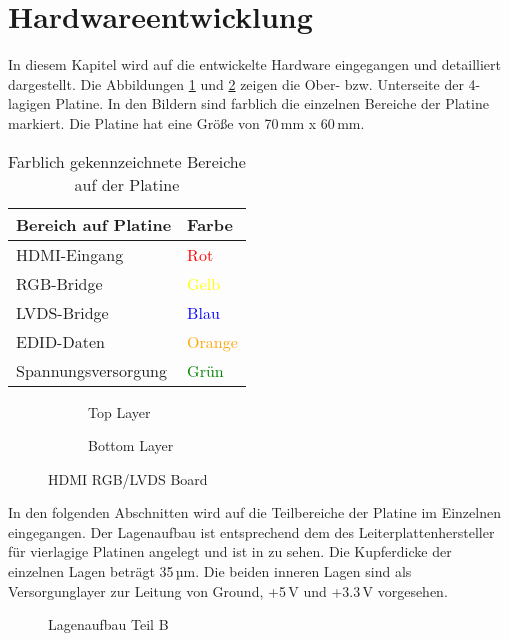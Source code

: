\section{Hardwareentwicklung}
\label{sec:TeilB_Hardware}
In diesem Kapitel wird auf die entwickelte Hardware eingegangen und detailliert dargestellt. Die Abbildungen \ref{fig:teilb_pcb_top} und \ref{fig:teilb_pcb_bot} zeigen die Ober- bzw. Unterseite der 4-lagigen Platine. In den Bildern sind farblich die einzelnen Bereiche der Platine markiert. Die Platine hat eine Größe von 70\,mm x 60\,mm.

\begin{table}[h]
\begin{tabular}{|p{8cm}|p{5.5cm}|}\hline
\rowcolor{TableBackgroundColor} 
   \textbf{Bereich auf Platine} & \textbf{Farbe}\\ \hline
  HDMI-Eingang &  \textcolor{red}{Rot} \\ \hline
  RGB-Bridge & \textcolor{yellow}{Gelb} \\ \hline
  LVDS-Bridge & \textcolor{blue}{Blau}  \\ \hline
  EDID-Daten &  \textcolor{orange}{Orange} \\ \hline
  Spannungsversorgung &  \textcolor{green}{Grün} \\ \hline 
\end{tabular}
\caption{Farblich gekennzeichnete Bereiche auf der Platine}
\label{tab:pcb_areas}
\end{table}

\begin{figure}[htbp]
        \centering
        \begin{subfigure}[htp]{0.48\textwidth}
                \caption{Top Layer}
                \label{fig:teilb_pcb_top}
        \end{subfigure}
\quad 
        \begin{subfigure}[htp]{0.48\textwidth}
                             				\caption{Bottom Layer}
                \label{fig:teilb_pcb_bot}
        \end{subfigure}
        \caption{HDMI RGB/LVDS Board}
        \label{fig:teilb_pcb}
\end{figure}

In den folgenden Abschnitten wird auf die Teilbereiche der Platine im Einzelnen eingegangen. Der Lagenaufbau ist entsprechend dem des Leiterplattenhersteller für vierlagige Platinen angelegt und ist in  zu sehen. Die Kupferdicke der einzelnen Lagen beträgt 35\,µm. Die beiden inneren Lagen sind als Versorgunglayer zur Leitung von Ground, +5\,V und +3.3\,V vorgesehen.
        \begin{figure}[htp]
        	\center
            \caption{Lagenaufbau Teil B}
            \label{fig:teilb_lagenaufbau}
        \end{figure}

